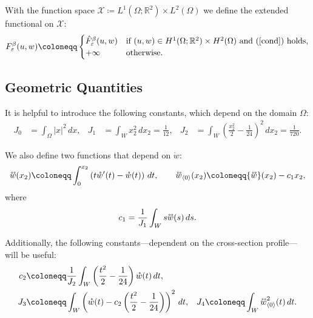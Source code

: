 \documentclass[a4, 11pt, reqno, final]{amsart}
\newcommand{\calX}{\mathcal{X}}
\newcommand{\bbR}{\mathbb{R}}
\newcommand\e{\varepsilon}
\newcommand\ringring[1]{%
	{%
		\mathop{\kern0pt #1}\limits^{%
			\vbox to-1.85ex{
				\kern-2ex %
				\hbox to 0pt{\hss\normalfont\kern.1em \r{}\kern-.45em \r{}\hss}%
				\vss %
			}%
		}%
	}%
}
\theoremstyle{plain}%
\begin{document}
	With the function space $\calX \coloneqq L^1(\Omega; \bbR^2) \times L^2(\Omega)$ we define the extended functional on $\calX$:
	\begin{equation}\label{eq:augm}
		F_{\e}^\beta(u, w) \coloneqq
		\begin{cases}
			\hat{F}_\e^\beta(u, w) & \text{if } (u, w) \in H^1(\Omega; \bbR^2) \times H^2(\Omega) \text{ and (\ref{cond}) holds}, \\
			+\infty & \text{otherwise}.
		\end{cases}
	\end{equation}


	\subsection{Geometric Quantities}

	It is helpful to introduce the following constants, which depend on the domain $\Omega$:
	\begin{equation}\label{constants}
		\begin{aligned}
			J_0 &= \int_\Omega |x|^2 \, dx, &
			J_1 &= \int_W x_2^2 \, dx_2 = \frac{1}{12}, &
			J_2 &= \int_W \left(\frac{x_2^2}{2} - \frac{1}{24} \right)^2 \, dx_2 = \frac{1}{720}.
		\end{aligned}
	\end{equation}

	We also define two functions that depend on $\mathring{w}$:
	\begin{equation}\label{w0}
		\ringring{w}(x_2) \coloneqq \int_{0}^{x_2} \left(t \mathring{w}'(t) - \mathring{w}(t)\right) \, dt,
		\qquad
		\ringring{w}_{\langle 0 \rangle}(x_2) \coloneqq \ringring{w}(x_2) - c_1 x_2,
	\end{equation}
	where
	\begin{equation}\label{cJ0}
		c_1 = \frac{1}{J_1} \int_W s \ringring{w}(s) \, ds.
	\end{equation}

	Additionally, the following constants—dependent on the cross-section profile—will be useful:
	\begin{equation}\label{cJ}
		\begin{aligned}
			c_2 &\coloneqq \frac{1}{J_2} \int_W \left( \frac{t^2}{2} - \frac{1}{24} \right) \mathring{w}(t) \, dt, \\
			J_3 &\coloneqq \int_W \left( \mathring{w}(t) - c_2 \left( \frac{t^2}{2} - \frac{1}{24} \right) \right)^2 \, dt, &
			J_4 \coloneqq \int_W \ringring{w}_{\langle 0 \rangle}^2(t) \, dt.
		\end{aligned}
	\end{equation}
\end{document}
